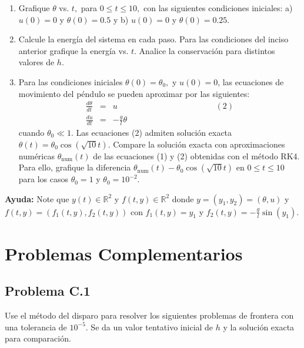 \documentclass[11pt]{article}
\begin{document}
\begin{enumerate}
\def\labelenumi{\arabic{enumi}.}
\item
  Grafique \(\theta\) vs. \(t,\) para \(0\le t\le 10,\) con las
  siguientes condiciones iniciales: a) \(u(0)=0\) y \(\theta(0)=0.5\) y
  b) \(u(0)=0\) y \(\theta(0)=0.25\).
\item
  Calcule la energía del sistema en cada paso. Para las condiciones del
  inciso anterior grafique la energía vs. \(t\). Analice la conservación
  para distintos valores de \(h\).
\item
  Para las condiciones iniciales \(\theta(0)=\theta_0,\) y \(u(0)=0\),
  las ecuaciones de movimiento del péndulo se pueden aproximar por las
  siguientes: \begin{eqnarray}
  \frac{d\theta}{d t} &=& u \hspace{5cm} (2)\\
  \frac{d u}{d t} &=& - \frac{g}{l} \theta
  \end{eqnarray} cuando \(\theta_0\ll 1\). Las ecuaciones (2) admiten
  solución exacta \(\theta(t) = \theta_0 \cos(\sqrt{10}t)\). Compare la
  solución exacta con aproximaciones numéricas
  \(\theta_{\mathrm{num}}(t)\) de las ecuaciones (1) y (2) obtenidas con
  el método RK4. Para ello, grafique la diferencia
  \(\theta_{\mathrm{num}}(t)-\theta_0 \cos(\sqrt{10}t)\) en
  \(0\le t\le 10\) para los casos \(\theta_0=1\) y \(\theta_0=10^{-2}\).
\end{enumerate}

\textbf{Ayuda:} Note que \(y(t)\in \mathbb{R}^2\) y
\(f(t,y)\in \mathbb{R}^2\) donde \(y=(y_1,y_2)=(\theta,u)\) y
\(f(t,y)=(f_1(t,y),f_2(t,y))\) con \(f_1(t,y)=y_1\) y
\(f_2(t,y)=-\frac{g}{l}\sin(y_1)\).

    \hypertarget{problemas-complementarios}{%
\section*{Problemas Complementarios}\label{problemas-complementarios}}

    \hypertarget{problema-c.1}{%
\subsection*{Problema C.1}\label{problema-c.1}}

Use el método del disparo para resolver los siguientes problemas de
frontera con una tolerancia de \(10^{-5}\). Se da un valor tentativo
inicial de \(h\) y la solución exacta para comparación.
\end{document}
